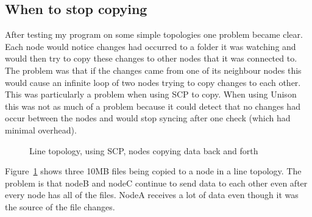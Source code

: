 \documentclass[12pt]{article}
\begin{document}
\subsection{When to stop copying}
After testing my program on some simple topologies one problem became
clear. Each node would notice changes had occurred to a folder
it was watching and would then try to copy these changes to other
nodes that it was connected to. The problem was that if the changes
came from one of its neighbour nodes this would cause an infinite loop
of two nodes trying to copy changes to each other. This was particularly 
a problem when using SCP to copy. When using Unison this was not as much of
a problem because it could detect that no changes had occur between the nodes
and would stop syncing after one check (which had minimal overhead).

\begin{figure}[htp]
    \caption{Line topology, using SCP, nodes copying data back and forth}
    \label{fig:line_scp_back_forth_graph}
\end{figure}

Figure~\ref{fig:line_scp_back_forth_graph} shows three 10MB files being copied to a node
in a line topology. The problem is that nodeB and nodeC continue to send
data to each other even after every node has all of the files. NodeA receives
a lot of data even though it was the source of the file changes. 
\end{document}
